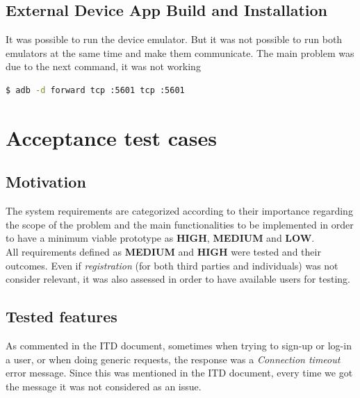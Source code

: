 \documentclass[a4paper, hidelinks, 12pt]{report}
\begin{document}
\begin{itemize}
\begin{enumerate}
	\section{External Device App Build and Installation}
	It was possible to run the device emulator. But it was not possible to run both emulators at the same time and make them communicate. The main problem was due to the next command, it was not working
	
		\begin{lstlisting}[language=bash]
			$ adb -d forward tcp :5601 tcp :5601
		\end{lstlisting}
	
		\end{enumerate}
	\end{itemize}

	\chapter{Acceptance test cases}
	
	\section{Motivation}
	The system requirements are categorized according to their importance regarding the scope of the problem and the main functionalities to be implemented in order to have a minimum viable prototype as \textbf{HIGH}, \textbf{MEDIUM} and \textbf{LOW}. \\

	All requirements defined as \textbf{MEDIUM} and \textbf{HIGH} were tested and their outcomes. Even if \textit{registration} (for both third parties and individuals) was not consider relevant, it was also assessed in order to have available users for testing.

	\section{Tested features}
	As commented in the ITD document, sometimes when trying to sign-up or log-in a user, or when doing generic requests, the response was a \textit{Connection timeout} error message. Since this was mentioned in the ITD document, every time we got the message it was not considered as an issue.
\end{document}
